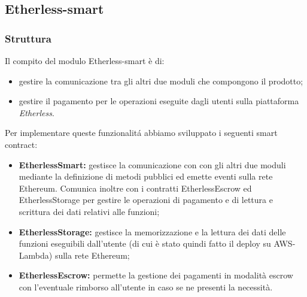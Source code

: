 \subsection{Etherless-smart}

\subsubsection{Struttura}
  Il compito del modulo Etherless-smart è di:
  \begin{itemize}
    \item gestire la comunicazione tra gli altri due moduli che compongono il prodotto;
    \item gestire il pagamento per le operazioni eseguite dagli utenti sulla piattaforma \textit{Etherless}.
  \end{itemize}
  Per implementare queste funzionalitá abbiamo sviluppato i seguenti smart contract:
  \begin{itemize}
    \item \textbf{EtherlessSmart:} gestisce la comunicazione con con gli altri due moduli mediante la definizione di metodi pubblici ed emette eventi sulla rete Ethereum. Comunica inoltre con i contratti EtherlessEscrow ed EtherlessStorage per gestire le operazioni di pagamento e di lettura e scrittura dei dati relativi alle funzioni;
    \item \textbf{EtherlessStorage:} gestisce la memorizzazione e la lettura dei dati delle funzioni eseguibili dall'utente (di cui è stato quindi fatto il deploy su AWS-Lambda) sulla rete Ethereum;
    \item \textbf{EtherlessEscrow:} permette la gestione dei pagamenti in modalità escrow con l'eventuale rimborso all'utente in caso se ne presenti la necessità.
  \end{itemize}
  
